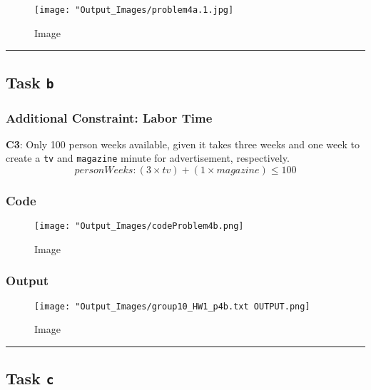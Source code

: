 \documentclass[
  12pt,
]{article}
\begin{document}
\begin{figure}
\centering
\texttt{[image: "Output\_Images/problem4a.1.jpg]}
\caption{Image}
\end{figure}

\begin{center}\rule{0.5\linewidth}{0.5pt}\end{center}

\hypertarget{task-b}{%
\subsection{\texorpdfstring{Task \texttt{b}}{Task b}}\label{task-b}}

\hypertarget{additional-constraint-labor-time}{%
\subsubsection{Additional Constraint: Labor
Time}\label{additional-constraint-labor-time}}

\textbf{C3}: Only 100 person weeks available, given it takes three weeks
and one week to create a \texttt{tv} and \texttt{magazine} minute for
advertisement, respectively.\\
\[
personWeeks: (3 \times tv) + (1 \times magazine) \leq 100
\]

\hypertarget{code-2}{%
\subsubsection{Code}\label{code-2}}

\begin{figure}
\centering
\texttt{[image: "Output\_Images/codeProblem4b.png]}
\caption{Image}
\end{figure}

\hypertarget{output-2}{%
\subsubsection{Output}\label{output-2}}

\begin{figure}
\centering
\texttt{[image: "Output\_Images/group10\_HW1\_p4b.txt OUTPUT.png]}
\caption{Image}
\end{figure}

\begin{center}\rule{0.5\linewidth}{0.5pt}\end{center}

\hypertarget{task-c}{%
\subsection{\texorpdfstring{Task \texttt{c}}{Task c}}\label{task-c}}
\end{document}
